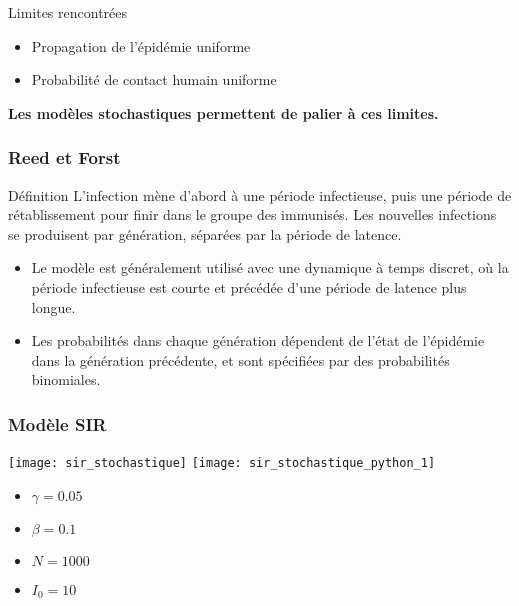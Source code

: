 \begin{frame}
    \begin{block}{Limites rencontrées}
        \begin{itemize}
            \item Propagation de l'épidémie uniforme
            \item Probabilité de contact humain uniforme
        \end{itemize}
    \end{block}

    \begin{center}
        \bf Les modèles stochastiques permettent de palier à ces limites.
    \end{center}
\end{frame}


\begin{frame}
    \frametitle{Reed et Forst}

    \begin{block}{Définition}
        L'infection mène d'abord à une période infectieuse, puis une période de rétablissement pour finir dans le groupe des immunisés. Les nouvelles infections se produisent par génération, séparées par la période de latence.
    \end{block}

    \begin{itemize}
        \item Le modèle est généralement utilisé avec une dynamique à temps discret, où la période infectieuse est courte et précédée d’une période de latence plus longue.
        \item Les probabilités dans chaque génération dépendent de l’état de l’épidémie dans la génération précédente, et sont spécifiées par des probabilités binomiales.
    \end{itemize}
\end{frame}

\begin{frame}
        \frametitle{Modèle SIR}

		\texttt{[image: sir\_stochastique]}
		\texttt{[image: sir\_stochastique\_python\_1]}

        \begin{multicols}{2}
            \begin{itemize}
                    \item $\gamma = 0.05$
                    \item $\beta = 0.1$
                    \item $N = 1000$
                    \item $I_0 = 10$
            \end{itemize}
        \end{multicols}

\end{frame}

